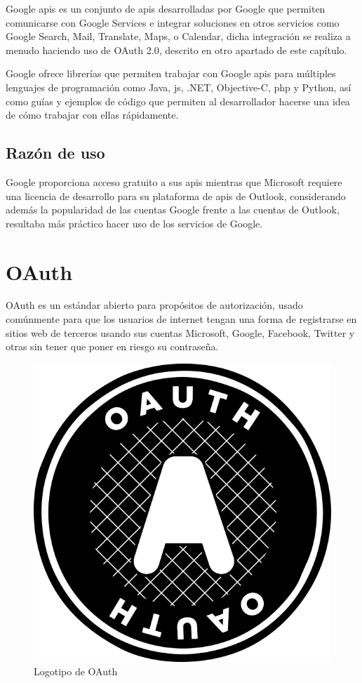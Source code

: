 Google \acrshort{api}s\cite{GoogleAPIs} es un conjunto de \acrfull{api}s desarrolladas por Google que permiten comunicarse con Google Services e integrar soluciones en otros servicios como Google Search, Mail, Translate, Maps, o Calendar, dicha integración se realiza a menudo haciendo uso de OAuth 2.0, descrito en otro apartado de este capítulo.

Google ofrece librerías que permiten trabajar con Google \acrshort{api}s para múltiples lenguajes de programación como Java, \acrfull{js}, .NET, Objective-C, \acrshort{php} y Python, así como guías y ejemplos de código que permiten al desarrollador hacerse una idea de cómo trabajar con ellas rápidamente.

\subsection{Razón de uso}

Google proporciona acceso gratuito a sus \acrshort{api}s mientras que Microsoft requiere una licencia de desarrollo para su plataforma de \acrshort{api}s de Outlook, considerando además la popularidad de las cuentas Google frente a las cuentas de Outlook, resultaba más práctico hacer uso de los servicios de Google.

\section{OAuth}

OAuth\cite{OAuth} es un estándar abierto para propósitos de autorización, usado comúnmente para que los usuarios de internet tengan una forma de registrarse en sitios web de terceros usando sus cuentas Microsoft, Google, Facebook, Twitter y otras sin tener que poner en riesgo su contraseña.

\begin{figure}[!htbp]
	\centering
	\includegraphics[scale=0.35]{fig/oauth_logo}
	\caption{Logotipo de OAuth}
\end{figure}

